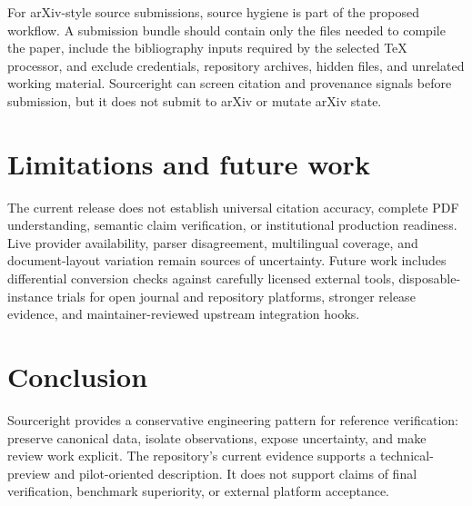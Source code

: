 \documentclass[11pt]{article}
\begin{document}
For arXiv-style source submissions, source hygiene is part of the proposed
workflow. A submission bundle should contain only the files needed to compile
the paper, include the bibliography inputs required by the selected TeX
processor, and exclude credentials, repository archives, hidden files, and
unrelated working material. Sourceright can screen citation and provenance
signals before submission, but it does not submit to arXiv or mutate arXiv
state.

\section{Limitations and future work}

The current release does not establish universal citation accuracy, complete
PDF understanding, semantic claim verification, or institutional production
readiness. Live provider availability, parser disagreement, multilingual
coverage, and document-layout variation remain sources of uncertainty. Future
work includes differential conversion checks against carefully licensed
external tools, disposable-instance trials for open journal and repository
platforms, stronger release evidence, and maintainer-reviewed upstream
integration hooks.

\section{Conclusion}

Sourceright provides a conservative engineering pattern for reference
verification: preserve canonical data, isolate observations, expose
uncertainty, and make review work explicit. The repository's current evidence
supports a technical-preview and pilot-oriented description. It does not
support claims of final verification, benchmark superiority, or external
platform acceptance.



\end{document}
